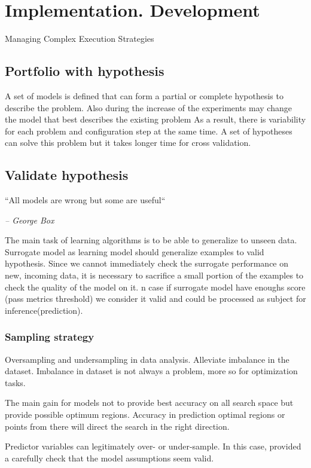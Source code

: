 \chapter{Implementation. Development}
Managing Complex Execution Strategies

\section{Portfolio with hypothesis}
A set of models is defined that can form a partial or complete hypothesis to describe the problem.
Also during the increase of the experiments may change the model that best describes the existing problem
As a result, there is variability for each problem and configuration step at the same time. 
A set of hypotheses can solve this problem but it takes longer time for cross validation.

\section{Validate hypothesis}
    \epigraph{``All models are wrong but some are useful``}{\textit{– George Box}}

    The main task of learning algorithms is to be able to generalize to unseen data. Surrogate model as learning model should generalize examples to valid hypothesis. 
    Since we cannot immediately check the surrogate performance on new, incoming data, it is necessary to sacrifice a small portion of the examples to check the quality of the model on it.
    n case if surrogate model have enoughs score (pass metrics threshold) we consider it valid and could be processed as subject for inference(prediction).

    \subsection{Sampling strategy}
    Oversampling and undersampling in data analysis. Alleviate imbalance in the dataset. 
    Imbalance in dataset is not always a problem, more so for optimization tasks. 

    The main gain for models not to provide best accuracy on all search space but provide possible optimum regions.
    Accuracy in prediction optimal regions or points from there will direct the search in the right direction.

    Predictor variables can legitimately over- or under-sample. 
    In this case, provided a carefully check that the model assumptions seem valid.

